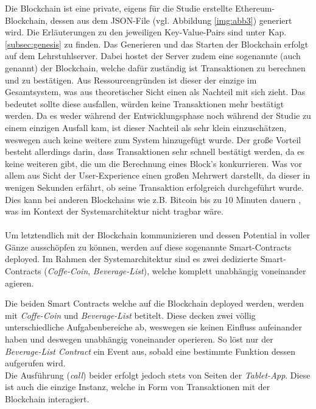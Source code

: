 \clearpage
{}
Die Blockchain ist eine private, eigens für die Studie erstellte Ethereum-Blockchain, dessen  aus dem JSON-File (vgl. Abbildung \ref{img:abb3}) generiert wird. Die Erläuterungen zu den jeweiligen Key-Value-Pairs sind unter Kap. \ref{subsec:genesis} zu finden.
Das Generieren und das Starten der Blockchain erfolgt auf dem Lehrstuhlserver.
Dabei hostet der Server zudem eine sogenannte  (auch  genannt) der Blockchain, welche dafür zuständig ist Transaktionen zu berechnen und zu bestätigen.
Aus Ressourcengründen ist dieser  der einzige im Gesamtsystem, was aus theoretischer Sicht einen  \cite{SPOF:Wiki} als Nachteil mit sich zieht. Das bedeutet sollte diese  ausfallen, würden keine Transaktionen mehr bestätigt werden. Da es weder während der Entwicklungsphase noch während der Studie zu einem einzigen Ausfall kam, ist dieser Nachteil als sehr klein einzuschätzen, weswegen auch keine weitere  zum System hinzugefügt wurde. Der große Vorteil besteht allerdings darin, dass Transaktionen sehr schnell bestätigt werden, da es keine weiteren  gibt, die um die Berechnung eines Block's konkurrieren. Was vor allem aus Sicht der User-Experience \cite{UE:Wiki} einen großen Mehrwert darstellt, da dieser in wenigen Sekunden erfährt, ob seine Transaktion erfolgreich durchgeführt wurde. Dies kann bei anderen Blockchains wie z.B. Bitcoin bis zu 10 Minuten dauern \cite{MINING:kryptopedia}, was im Kontext der Systemarchitektur nicht tragbar wäre.\\\\
Um letztendlich mit der Blockchain kommunizieren und dessen Potential in voller Gänze ausschöpfen zu können, werden auf diese sogenannte Smart-Contracts \cite{SC:EconomyOutlook} deployed. Im Rahmen der Systemarchitektur sind es zwei dedizierte Smart-Contracts (\textit{Coffe-Coin}, \textit{Beverage-List}), welche komplett unabhängig voneinander agieren.

\clearpage
{}
Die beiden Smart Contracts welche auf die Blockchain deployed werden, werden mit \textit{Coffe-Coin} und \textit{Beverage-List} betitelt.
Diese decken zwei völlig unterschiedliche Aufgabenbereiche ab, weswegen sie keinen Einfluss aufeinander haben und deswegen unabhängig voneinander operieren.
So löst nur der \textit{Beverage-List Contract} ein Event aus, sobald eine bestimmte Funktion dessen aufgerufen wird. \\
Die Ausführung (\textit{call}) beider erfolgt jedoch stets von Seiten der \textit{Tablet-App}. Diese ist auch die einzige Instanz, welche in Form von Transaktionen mit der Blockchain interagiert.

